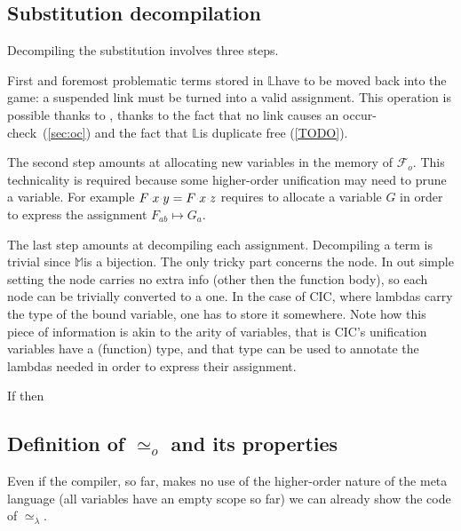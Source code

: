 \documentclass[sigconf,natbib=false,review]{acmart}
\newcommand{\appsep}{\ensuremath{\textcolor{lightgray}{\cdot}}}
\newcommand{\UnifRel}{\ensuremath{\simeq}}
\newcommand{\Uo}{\texorpdfstring{\ensuremath{\UnifRel_o}\xspace}{unif\_o}}
\newcommand{\Ue}{\ensuremath{\UnifRel_\lambda}\xspace}
\newcommand{\Fo}{\texorpdfstring{\ensuremath{\mathcal{F}_{\!o}\xspace}}{Fo}} %
\newcommand{\linkStore}{\texorpdfstring{\ensuremath{\mathbb{L}}\xspace}{L}}
\newcommand{\mapStore}{\texorpdfstring{\ensuremath{\mathbb{M}}\xspace}{M}}
\begin{document}
\subsection{Substitution decompilation}

Decompiling the substitution involves three steps.

First and foremost problematic terms stored in
\linkStore have to be moved back into the game:
a suspended link must be turned into a valid assignment.
This operation is possible thanks to ,
thanks to the fact that no link causes an occur-check~(\ref{sec:oc})
and the fact that \linkStore is duplicate free (\cref{TODO}).

The second step amounts at allocating new variables in the
memory of \Fo{}. This technicality is required because some
higher-order unification may need to prune a variable. For example
$F\appsep x\appsep y = F\appsep x\appsep z$ requires to allocate a 
variable $G$ in order to express the assignment $F_{ab} \mapsto G_a$.

The last step amounts at decompiling each assignment.
Decompiling a term is trivial since \mapStore is a bijection.
The only tricky part concerns the  node. In out simple setting
the  node carries no extra info (other then the function body),
so each  node can be trivially converted to a  one.
In the case of CIC, where lambdas carry the type of the bound variable, one
has to store it somewhere. Note how this piece of information is akin
to the arity of variables, that is CIC's unification variables have a
(function) type, and that type can be used to annotate the lambdas
needed in order to express their assignment.

\begin{lemma}\label{prop:comprt} If
   then 
\end{lemma}

\subsection{Definition of \Uo{} and its properties}\label{sec:founif}

Even if the compiler, so far, makes no use 
of the higher-order nature of the meta language (all variables have
an empty scope so far) we can already show the code of \Ue{}.
\end{document}
